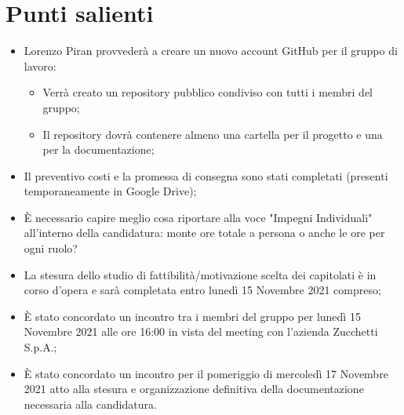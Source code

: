\documentclass[11pt]{article}
\begin{document}
	\newpage

	\section{Punti salienti}
		\begin{itemize}
			\item Lorenzo Piran provvederà a creare un nuovo account GitHub per il gruppo di lavoro:
			\begin{itemize}
				\item Verrà creato un repository pubblico condiviso con tutti i membri del gruppo;
				\item Il repository dovrà contenere almeno una cartella per il progetto e una per la documentazione;
			\end{itemize}
			\item Il preventivo costi e la promessa di consegna sono stati completati (presenti temporaneamente
			in Google Drive);
			\item È necessario capire meglio cosa riportare alla voce "Impegni Individuali" all'interno della
			candidatura: monte ore totale a persona o anche le ore per ogni ruolo?
			\item La stesura dello studio di fattibilità/motivazione scelta dei capitolati è in corso d'opera e
			sarà completata entro lunedì 15 Novembre 2021 compreso;
			\item È stato concordato un incontro tra i membri del gruppo per lunedì 15 Novembre 2021 alle ore 16:00 in
			vista del meeting con l'azienda Zucchetti S.p.A.;
			\item È stato concordato un incontro per il pomeriggio di mercoledì 17 Novembre 2021 atto alla stesura e
			organizzazione definitiva della documentazione necessaria alla candidatura.
		\end{itemize}
\end{document}
